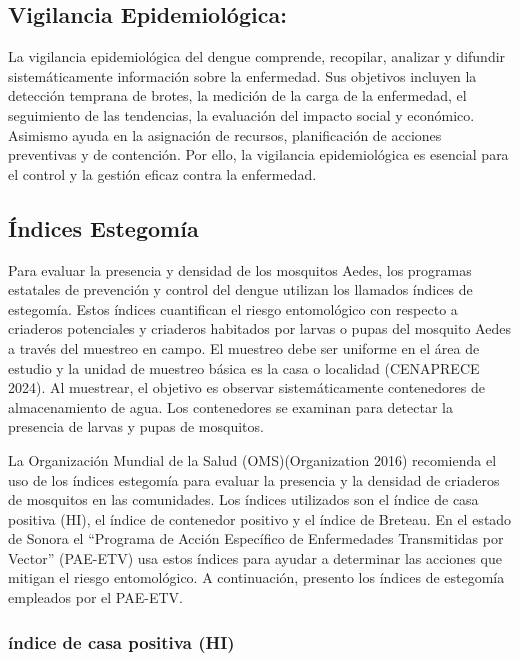 \documentclass[
  letterpaper,
  twocolumn,
  landscape]{report}
\begin{document}
\subsection{Vigilancia
Epidemiológica:}\label{vigilancia-epidemioluxf3gica}

La vigilancia epidemiológica del dengue comprende, recopilar, analizar y
difundir sistemáticamente información sobre la enfermedad. Sus objetivos
incluyen la detección temprana de brotes, la medición de la carga de la
enfermedad, el seguimiento de las tendencias, la evaluación del impacto
social y económico. Asimismo ayuda en la asignación de recursos,
planificación de acciones preventivas y de contención. Por ello, la
vigilancia epidemiológica es esencial para el control y la gestión
eficaz contra la enfermedad.

\subsection{Índices Estegomía}\label{uxedndices-estegomuxeda}

Para evaluar la presencia y densidad de los mosquitos Aedes, los
programas estatales de prevención y control del dengue utilizan los
llamados índices de estegomía. Estos índices cuantifican el riesgo
entomológico con respecto a criaderos potenciales y criaderos habitados
por larvas o pupas del mosquito Aedes a través del muestreo en campo. El
muestreo debe ser uniforme en el área de estudio y la unidad de muestreo
básica es la casa o localidad (CENAPRECE 2024). Al muestrear, el
objetivo es observar sistemáticamente contenedores de almacenamiento de
agua. Los contenedores se examinan para detectar la presencia de larvas
y pupas de mosquitos.

La Organización Mundial de la Salud (OMS)(Organization 2016) recomienda
el uso de los índices estegomía para evaluar la presencia y la densidad
de criaderos de mosquitos en las comunidades. Los índices utilizados son
el índice de casa positiva (HI), el índice de contenedor positivo y el
índice de Breteau. En el estado de Sonora el ``Programa de Acción
Específico de Enfermedades Transmitidas por Vector'' (PAE-ETV) usa estos
índices para ayudar a determinar las acciones que mitigan el riesgo
entomológico. A continuación, presento los índices de estegomía
empleados por el PAE-ETV.

\subsubsection*{índice de casa positiva
(HI)}\label{uxedndice-de-casa-positiva-hi}
\end{document}
